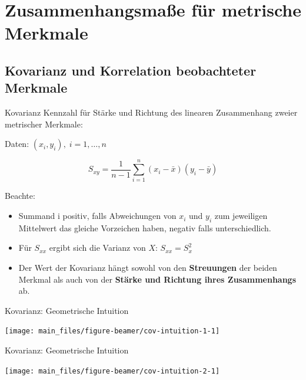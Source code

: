 \documentclass[
  10pt,
  ignorenonframetext,
]{beamer}
\providecommand{\tightlist}{%
  \setlength{\itemsep}{0pt}\setlength{\parskip}{0pt}}
\begin{document}
\section{Zusammenhangsmaße für metrische
Merkmale}\label{zusammenhangsmauxdfe-fuxfcr-metrische-merkmale}

\subsection{Kovarianz und Korrelation beobachteter
Merkmale}\label{kovarianz-und-korrelation-beobachteter-merkmale}

\begin{frame}{Kovarianz}
\label{kovarianz}
Kennzahl für Stärke und Richtung des linearen Zusammenhang zweier
metrischer Merkmale:

\vspace{0.3cm}

Daten: \((x_i,y_i),\; i=1,\ldots,n\)

\begin{equation*}
  S_{xy} = \frac{1}{n-1} \sum_{i=1}^n(x_i - \bar x)(y_i - \bar y)
\end{equation*}

Beachte:

\begin{itemize}
\tightlist
\item
  Summand i positiv, falls Abweichungen von \(x_i\) und \(y_i\) zum
  jeweiligen Mittelwert das gleiche Vorzeichen haben, negativ falls
  unterschiedlich.
\item
  Für \(S_{xx}\) ergibt sich die Varianz von \(X\): \(S_{xx} = S^2_{x}\)
\item
  Der Wert der Kovarianz hängt sowohl von den \textbf{Streuungen} der
  beiden Merkmal als auch von der \textbf{Stärke und Richtung ihres
  Zusammenhangs} ab.
\end{itemize}
\end{frame}

\begin{frame}{Kovarianz: Geometrische Intuition}
\label{kovarianz-geometrische-intuition}
\scriptsize\normalsize
\scriptsize

\begin{center}\texttt{[image: main\_files/figure-beamer/cov-intuition-1-1]} \end{center}

\normalsize
\end{frame}

\begin{frame}{Kovarianz: Geometrische Intuition}
\label{kovarianz-geometrische-intuition-1}
\scriptsize

\begin{center}\texttt{[image: main\_files/figure-beamer/cov-intuition-2-1]} \end{center}

\normalsize
\end{frame}
\end{document}
